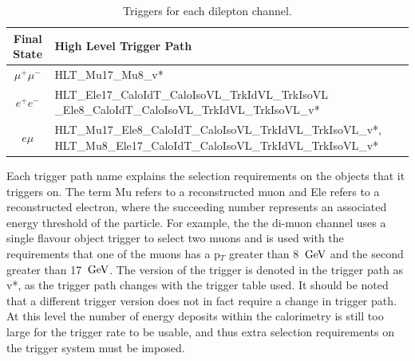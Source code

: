 \begin{table} 
\begin{center}
\begin{tabular}{|c|p{11.5cm}|}
\hline
	\textbf{Final State} & \textbf{High Level Trigger Path} \\
\hline
	$\mu^+\mu^-$ & HLT\_Mu17\_Mu8\_v* \\
	$e^+e^-$ & HLT\_Ele17\_CaloIdT\_CaloIsoVL\_TrkIdVL\_TrkIsoVL
				\_Ele8\_CaloIdT\_CaloIsoVL\_TrkIdVL\_TrkIsoVL\_v* \\
	$e\mu$ & HLT\_Mu17\_Ele8\_CaloIdT\_CaloIsoVL\_TrkIdVL\_TrkIsoVL\_v*, HLT\_Mu8\_Ele17\_CaloIdT\_CaloIsoVL\_TrkIdVL\_TrkIsoVL\_v* \\
\hline	
\end{tabular}
\end{center}
\caption{Triggers for each dilepton channel.}
\label{tab-HLTriggers}
\end{table}

Each trigger path name explains the selection requirements on the objects that it triggers on. The term Mu refers to a reconstructed muon and Ele refers to a reconstructed electron, where the succeeding number represents an associated energy threshold of the particle. For example, the the di-muon channel uses a single flavour object trigger to select two muons and is used with the requirements that one of the muons has a p$_T$ greater than 8 $\,\text{Ge\hspace{-.08em}V}$ and the second greater than 17 $\,\text{Ge\hspace{-.08em}V}$. The version of the trigger is denoted in the trigger path as v*, as the trigger path changes with the trigger table used. It should be noted that a different trigger version does not in fact require a change in trigger path. At this level the number of energy deposits within the calorimetry is still too large for the trigger rate to be usable, and thus extra selection requirements on the trigger system must be imposed.

